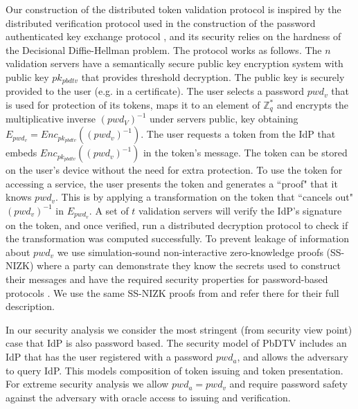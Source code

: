 \documentclass[conference]{IEEEtran}
\begin{document}
Our construction of the distributed token validation protocol is inspired by the distributed verification protocol used in the construction of the password authenticated key exchange protocol \cite{T-PAKE-Mackenzie},  and its security relies on  the hardness of the Decisional Diffie-Hellman problem.
The protocol works as follows. The $n$ validation servers have a semantically secure 
public key encryption system with public key $pk_{pbdtv}$ that provides threshold decryption. The public key is securely provided to the user (e.g. in a certificate). The user selects a password $pwd_v$ that is used for protection of its tokens, maps it
to an element of $\mathbb{Z}^{*}_{q}$ and encrypts the multiplicative inverse $(pwd_{V})^{-1}$ under servers public, key obtaining $E_{pwd_{v}}= Enc_{pk_{pbdtv}}((pwd_{v})^{-1})$. The user requests  a token from the IdP that embeds $Enc_{pk_{pbdtv}}((pwd_{v})^{-1})$ in the token's message. %
The token can be stored on the user's device without the need for extra protection.
To use the token for accessing a service, 
the user presents the token and generates a ``proof" that it knows $pwd_v$.  This is by applying a transformation on the token that ``cancels out" $(pwd_{v})^{-1}$ in $E_{pwd_{v}}$. A set of $t$ validation servers will verify the IdP's signature on the token, and once verified, run a distributed decryption protocol to check if the transformation was computed successfully. %
To prevent leakage of information about $pwd_{v}$ we use simulation-sound \cite{814628} non-interactive zero-knowledge proofs (SS-NIZK) where a party can demonstrate they know the secrets used to construct their messages and have the required security properties for password-based protocols \cite{cryptoeprint:2014/429}. We use the same SS-NIZK proofs from \cite{T-PAKE-Mackenzie} and refer there for their full description. %

In our security analysis we consider the most stringent (from security view point) case that IdP is also password based. The security model of PbDTV includes an IdP that has the user registered with a password $pwd_a$, and allows the adversary to query IdP. This models composition of token issuing and token presentation. For extreme security analysis we allow $pwd_a = pwd_v$ and require password safety against the adversary with oracle access to issuing and verification.\\
\end{document}

